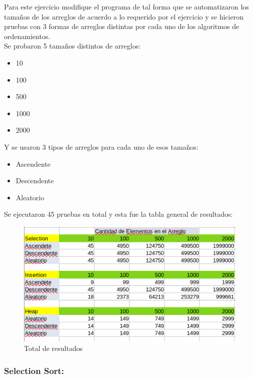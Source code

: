 \documentclass{article}
\begin{document}
		Para este ejercicio modifique el programa de tal forma que se automatizaron los tamaños de los arreglos de acuerdo a lo requerido por el ejercicio y se hicieron pruebas con 3 formas de arreglos distintas por cada uno de los algoritmos de ordenamientos.\\
		
		\noindent Se probaron 5 tamaños distintos de arreglos:
		
		\begin{itemize}
			\item 10
			\item 100
			\item 500
			\item 1000
			\item 2000
		\end{itemize} 
		
		\noindent Y se usaron 3 tipos de arreglos para cada uno de esos tamaños:
		
		\begin{itemize}
			\item Ascendente
			\item Descendente
			\item Aleatorio
		\end{itemize} 
	
		\noindent Se ejecutaron 45 pruebas en total y esta fue la tabla general de resultados:
				
		\begin{figure}[H]
			\centering
			\includegraphics[scale = 0.8]{images/total - graph}
			\caption{Total de resultados}
		\end{figure}
	
			\subsubsection{Selection Sort:}
			
\end{document}
